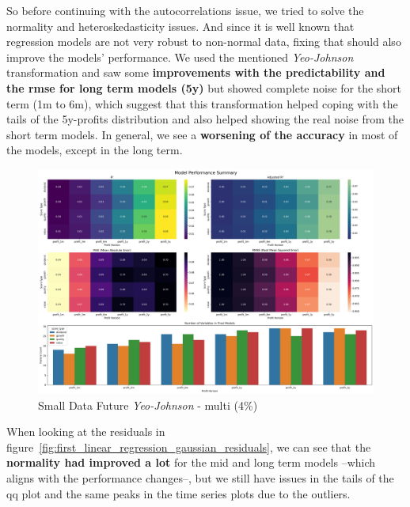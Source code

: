 \documentclass[11pt,english,a4paper,hidelinks]{book}
\begin{document}
\noindent So before continuing with the autocorrelations issue, we tried to solve the normality and heteroskedasticity issues. And since it is well known that regression models are not very robust to non-normal data, fixing that should also improve the models' performance. We used the mentioned \textit{Yeo-Johnson} transformation and saw some \textbf{improvements with the predictability and the \acrshort{rmse} for long term models (5y)} but showed complete noise for the short term (1m to 6m), which suggest that this transformation helped coping with the tails of the 5y-profits distribution and also helped showing the real noise from the short term models. In general, we see a \textbf{worsening of the accuracy} in most of the models, except in the long term.

\begin{figure}[H]
    \centering
    \includegraphics[width=1\textwidth]{images/code/models/linear_regression/first_model/Small Data future - Multi Gaussian performance.png}
    \caption{Small Data Future \textit{Yeo-Johnson} - \acrshort{multi} (4\%)}
    \label{fig:first_linear_regression_gaussian}
\end{figure}

\noindent When looking at the residuals in figure~\ref{fig:first_linear_regression_gaussian_residuals}, we can see that the \textbf{normality had improved a lot} for the mid and long term models --which aligns with the performance changes--, but we still have issues in the tails of the \acrshort{qq} plot and the same peaks in the time series plots due to the outliers.
\end{document}
